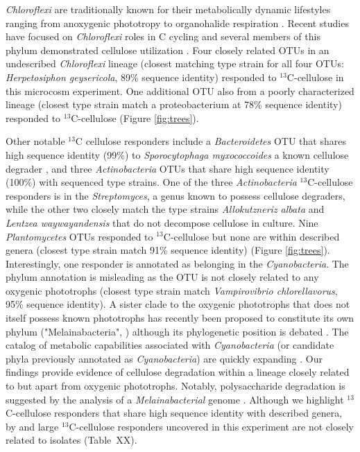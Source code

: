 \textit{Chloroflexi} are traditionally known for their metabolically dynamic
lifestyles ranging from anoxygenic phototropy to organohalide respiration
\cite{Hug_2013}. Recent studies have focused on \textit{Chloroflexi} roles in C
cycling \cite{Hug_2013, Goldfarb_2011,Cole_2013} and several members of this
phylum demonstrated cellulose utilization \cite{Goldfarb_2011, Cole_2013,
Hug_2013}. Four closely related OTUs in an undescribed \textit{Chloroflexi}
lineage (closest matching type strain for all four OTUs: \textit{Herpetosiphon
geysericola}, 89\% sequence identity) responded to $^{13}$C-cellulose in this
microcosm experiment. One additional OTU also from a poorly characterized
lineage (closest type strain match a proteobacterium at 78\% sequence identity)
responded to $^{13}$C-cellulose (Figure \ref{fig:trees}).

Other notable $^{13}$C cellulose responders include a \textit{Bacteroidetes}
OTU that shares high sequence identity (99\%) to \textit{Sporocytophaga
myxococcoides} a known cellulose degrader \cite{Vance_1980}, and three
\textit{Actinobacteria} OTUs that share high sequence identity (100\%) with
sequenced type strains. One of the three \textit{Actinobacteria}
$^{13}$C-cellulose responders is in the \textit{Streptomyces}, a genus known to
possess cellulose degraders, while the other two closely match the type strains
\textit{Allokutzneriz albata} \cite{Labeda_2008, Tomita_1993} and
\textit{Lentzea waywayandensis} \cite{LABEDA_1989, Labeda_2001} that do not
decompose cellulose in culture. Nine \textit{Plantomycetes} OTUs responded to
$^{13}$C-cellulose but none are within described genera (closest type strain
match 91\% sequence identity) (Figure \ref{fig:trees}). Interestingly, one
responder is annotated as belonging in the \textit{Cyanobacteria}. The phylum
annotation is misleading as the OTU is not closely related to any oxygenic
phototrophs (closest type strain match \textit{Vampirovibrio chlorellavorus},
95\% sequence identity). A sister clade to the oxygenic phototrophs that does
not itself possess known phototrophs has recently been proposed to constitute
its own phylum ("Melainabacteria", \cite{Di_Rienzi_2013}) although its
phylogenetic position is debated \cite{Soo_2014}. The catalog of metabolic
capabilities associated with \textit{Cyanobacteria} (or candidate phyla
previously annotated as \textit{Cyanobacteria}) are quickly expanding
\cite{Di_Rienzi_2013, Soo_2014}.  Our findings provide evidence of cellulose
degradation within a lineage closely related to but apart from oxygenic
phototrophs. Notably, polysaccharide degradation is suggested by the analysis
of a \textit{Melainabacterial} genome \cite{Di_Rienzi_2013}. Although we
highlight $^{13}$C-cellulose responders that share high sequence identity with
described genera, by and large $^{13}$C-cellulose responders uncovered in this
experiment are not closely related to isolates (Table~XX).

